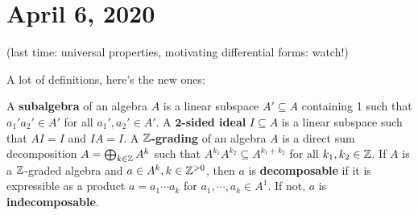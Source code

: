\section{April 6, 2020} 
(last time: universal properties, motivating differential forms: watch!)

A lot of definitions, here's the new ones:
\begin{definition}[]
    A \textbf{subalgebra} of an algebra $A$ is a linear subspace $A' \subseteq A$ containing 1 such that $a_1'a_2' \in A'$ for all $a_1',a_2' \in A'$. A $\mathbf 2$\textbf{-sided ideal} $I \subseteq A$ is a linear subspace such that $AI=I$ and $IA=I$. A $\mathbb{Z}$\textbf{-grading} of an algebra $A$ is a direct sum decomposition $A=\bigoplus_{k \in \mathbb{Z}}A^k$ such that $A^{k_1}A^{k_2}\subseteq A^{k_1+k_2}$ for all $k_1,k_2 \in \mathbb{Z}$. If $A$ is a $\mathbb{Z}$-graded algebra and $a \in A^k,k \in \mathbb{Z}^{>0}$, then $a$ is \textbf{decomposable} if it is expressible as a product $a=a_1\cdots a_k$ for $a_1,\cdots ,a_k \in A^1$. If not, $a$ is \textbf{indecomposable}.
\end{definition}
